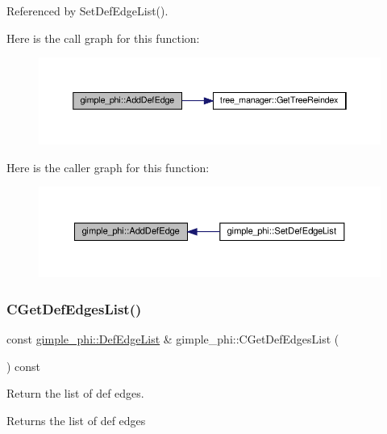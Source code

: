 Referenced by Set\+Def\+Edge\+List().

Here is the call graph for this function\+:
\nopagebreak
\begin{figure}[H]
\begin{center}
\leavevmode
\includegraphics[width=350pt]{d2/dfe/structgimple__phi_ab509d81560e1608d4778746a5dd79a42_cgraph}
\end{center}
\end{figure}
Here is the caller graph for this function\+:
\nopagebreak
\begin{figure}[H]
\begin{center}
\leavevmode
\includegraphics[width=350pt]{d2/dfe/structgimple__phi_ab509d81560e1608d4778746a5dd79a42_icgraph}
\end{center}
\end{figure}
\mbox{\label{structgimple__phi_a6c23001f31be0018466078548400aaa3}} 
\subsubsection{\texorpdfstring{C\+Get\+Def\+Edges\+List()}{CGetDefEdgesList()}}
{\footnotesize\ttfamily const \hyperlink{structgimple__phi_abaf4e51c9be92bf7efbf5aaaab82f386}{gimple\+\_\+phi\+::\+Def\+Edge\+List} \& gimple\+\_\+phi\+::\+C\+Get\+Def\+Edges\+List (\begin{DoxyParamCaption}{ }\end{DoxyParamCaption}) const}



Return the list of def edges. 

\begin{DoxyReturn}{Returns}
the list of def edges 
\end{DoxyReturn}


